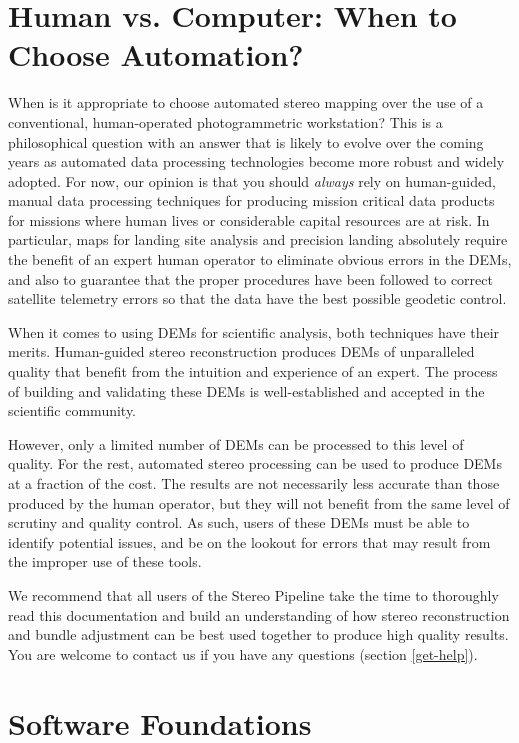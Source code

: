 \section{Human vs. Computer: When to Choose Automation?}

When is it appropriate to choose automated stereo mapping over the use
of a conventional, human-operated photogrammetric workstation?  This
is a philosophical question with an answer that is likely to evolve
over the coming years as automated data processing technologies become
more robust and widely adopted.  For now, our opinion is that you
should {\em always} rely on human-guided, manual data processing
techniques for producing mission critical data products for missions
where human lives or considerable capital resources are at risk.  In
particular, maps for landing site analysis and precision landing
absolutely require the benefit of an expert human operator to
eliminate obvious errors in the DEMs, and also to guarantee that the
proper procedures have been followed to correct satellite telemetry
errors so that the data have the best possible geodetic control.

When it comes to using \acp{DEM} for scientific analysis, both techniques
have their merits.  Human-guided stereo reconstruction produces \acp{DEM}
of unparalleled quality that benefit from the intuition and experience
of an expert.  The process of building and validating these \acp{DEM} is
well-established and accepted in the scientific community.

However, only a limited number of \acp{DEM} can be processed to this level
of quality.  For the rest, automated stereo processing can be used to
produce \acp{DEM} at a fraction of the cost.  The results are not
necessarily less accurate than those produced by the human operator,
but they will not benefit from the same level of scrutiny and quality
control.  As such, users of these \acp{DEM} must be able to identify
potential issues, and be on the lookout for errors that may result
from the improper use of these tools.

We recommend that all users of the Stereo Pipeline take the time to
thoroughly read this documentation and build an understanding of how
stereo reconstruction and bundle adjustment can be best used together to
produce high quality results. You are welcome to contact us if you have
any questions (section \ref{get-help}).

\section{Software Foundations}

